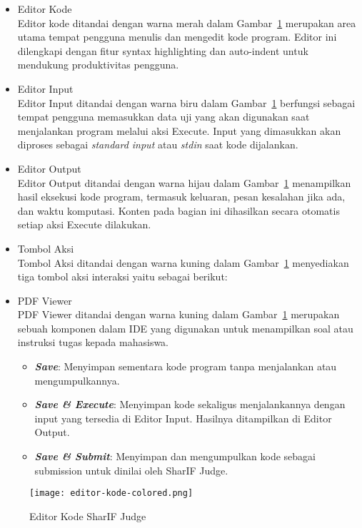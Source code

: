 \begin{itemize}
	\item Editor Kode \\
	      Editor kode ditandai dengan warna merah dalam Gambar~\ref{fig:3:1:editorkode} merupakan area utama tempat pengguna menulis dan mengedit kode program. Editor ini dilengkapi dengan fitur syntax highlighting dan auto-indent untuk mendukung produktivitas pengguna.
	\item Editor Input \\
	      Editor Input ditandai dengan warna biru dalam Gambar~\ref{fig:3:1:editorkode} berfungsi sebagai tempat pengguna memasukkan data uji yang akan digunakan saat menjalankan program melalui aksi Execute. Input yang dimasukkan akan diproses sebagai \textit{standard input} atau \textit{stdin} saat kode dijalankan.
	\item Editor Output \\
	      Editor Output ditandai dengan warna hijau dalam Gambar~\ref{fig:3:1:editorkode} menampilkan hasil eksekusi kode program, termasuk keluaran, pesan kesalahan jika ada, dan waktu komputasi. Konten pada bagian ini dihasilkan secara otomatis setiap aksi Execute dilakukan.
	\item Tombol Aksi \\
	      Tombol Aksi ditandai dengan warna kuning dalam Gambar~\ref{fig:3:1:editorkode} menyediakan tiga tombol aksi interaksi yaitu sebagai berikut:
	\item PDF Viewer \\
	      PDF Viewer ditandai dengan warna kuning dalam Gambar~\ref{fig:3:1:editorkode} merupakan sebuah komponen dalam IDE yang digunakan untuk menampilkan soal atau instruksi tugas kepada mahasiswa.

	      \begin{itemize}
		      \item \textbf{\textit{Save}}: Menyimpan sementara kode program tanpa menjalankan atau mengumpulkannya.
		      \item \textbf{\textit{Save \& Execute}}: Menyimpan kode sekaligus menjalankannya dengan input yang tersedia di Editor Input. Hasilnya ditampilkan di Editor Output.
		      \item \textbf{\textit{Save \& Submit}}: Menyimpan dan mengumpulkan kode sebagai submission untuk dinilai oleh SharIF Judge.
	      \end{itemize}
\end{itemize}

\begin{figure}[H]
	\centering
	\texttt{[image: editor-kode-colored.png]}
	\caption{Editor Kode SharIF Judge}
	\label{fig:3:1:editorkode}
\end{figure}


